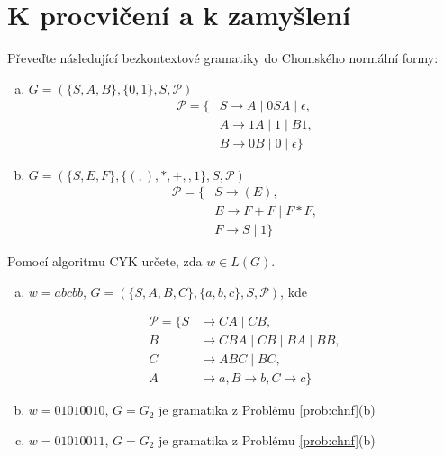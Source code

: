 \documentclass[a4paper,12pt]{amsart}
\begin{document}
\section*{K procvičení a k zamyšlení}


\medskip\begin{problem}

   Převeďte následující bezkontextové gramatiky do Chomského normální formy:
    \begin{multicols}{2}
        \begin{enumerate}[(a)]
    
            \item $G=(\{S,A,B\},\{0,1\},S,\mathcal P)$
            \begin{align*}
                \mathcal P=\{&S\rightarrow A\mid 0SA\mid \epsilon, \\
                &A\rightarrow 1A\mid 1\mid B1,\\
                &B\rightarrow 0B\mid 0\mid \epsilon\} 
            \end{align*}
    
            \item $G=(\{S,E,F\},\{(,),*,+,,1\},S,\mathcal P)$
            \begin{align*}
                \mathcal P=\{&
                S\rightarrow (E), \\
                &E\rightarrow F+F\mid F*F,\\
                &F\rightarrow S\mid 1\}
            \end{align*}

        \end{enumerate}
    \end{multicols}
        
\end{problem}


\medskip\begin{problem}
    
    Pomocí algoritmu CYK určete, zda $w\in L(G)$.

    \begin{enumerate}[(a)]\setlength{\itemsep}{6pt}

        \item $w=abcbb$, $G=(\{S,A,B,C\},\{a,b,c\},S,\mathcal P)$, kde
        
        \begin{align*}
            \mathcal P=\{S&\rightarrow CA\mid CB, \\
            B&\rightarrow CBA\mid CB\mid BA\mid BB, \\
            C&\rightarrow ABC\mid BC,\\
            A&\rightarrow a, B\rightarrow b, C\rightarrow c\}
        \end{align*}    

        \item $w=01010010$, $G=G_2$ je gramatika z Problému \ref{prob:chnf}(b)
        \item $w=01010011$, $G=G_2$ je gramatika z Problému \ref{prob:chnf}(b)

    \end{enumerate}

\end{problem}
\end{document}
